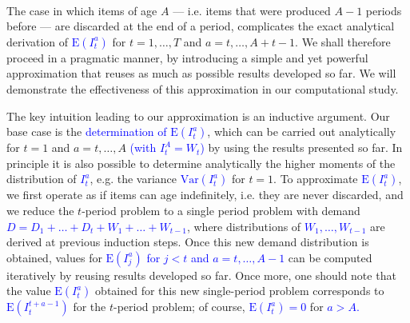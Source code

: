 \documentclass{tPRS2e}
\newcommand{\blue}{\textcolor{blue}}
\begin{document}
	\paragraph*{}
	The case in which items of age $A$ --- i.e. items that were produced $A-1$ periods before --- are discarded at the end of a period, complicates the exact analytical derivation of \blue{$\mathrm{E}(I^a_{t})$} for $t=1,\ldots,T$ and $a=t,\ldots,A+t-1$. We shall therefore proceed in a pragmatic manner, by introducing a simple and yet powerful approximation that reuses as much as possible results developed so far. We will demonstrate the effectiveness of this approximation in our computational study.
	
	The key intuition leading to our approximation is an inductive argument. Our base case is the \blue{determination of $\mathrm{E}(I^a_{t})$}, which can be carried out analytically for $t=1$ and $a=t,\ldots,A$ \blue{(with $I^A_{t}=W_t$)} by using the results presented so far. In principle it is also possible to determine analytically the higher moments of the distribution of \blue{$I^a_{t}$}, e.g. the variance \blue{$\mathrm{Var}(I^a_{t})$} for $t=1$. To approximate \blue{$\mathrm{E}(I^a_{t})$}, we first operate as if items can age indefinitely, i.e. they are never discarded, and we reduce the $t$-period problem to a single period problem with demand \blue{$D=D_1+\ldots+D_t+W_{1}+\ldots+W_{t-1}$}, where distributions of \blue{$W_{1},\ldots,W_{t-1}$} are derived at previous induction steps. Once this new demand distribution is obtained, values for \blue{$\mathrm{E}(I^a_{j})$ for $j<t$ and $a=t,\ldots,A-1$} can be computed iteratively by reusing results developed so far. Once more, one should note that the value \blue{$\mathrm{E}(I^a_{t})$} obtained for this new single-period problem corresponds to \blue{$\mathrm{E}(I^{t+a-1}_{t})$} for the $t$-period problem; of course, \blue{$\mathrm{E}(I^a_{t})=0$} for \blue{ $a>A$.}
	
\end{document}
